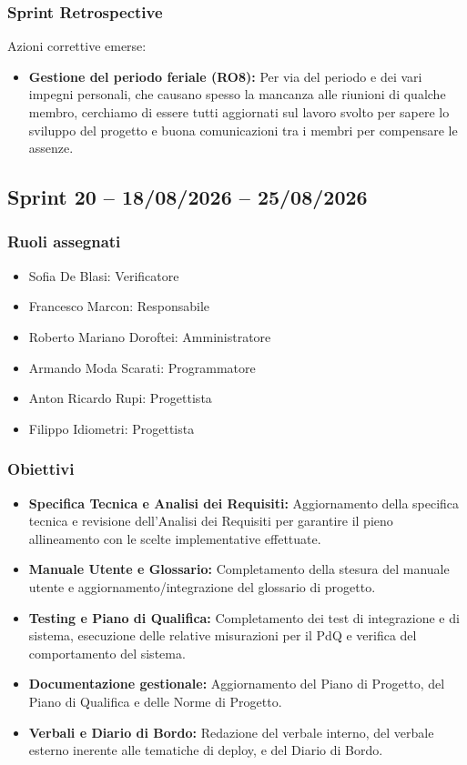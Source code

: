 \subsubsection{Sprint Retrospective}
Azioni correttive emerse:
\begin{itemize}
    \item \textbf{Gestione del periodo feriale (RO8):} Per via del periodo e dei vari impegni personali, che causano spesso la mancanza alle riunioni di qualche membro, cerchiamo di essere tutti aggiornati sul lavoro svolto per sapere lo sviluppo del progetto e buona comunicazioni tra i membri per compensare le assenze.
\end{itemize}

\subsection{Sprint 20 -- 18/08/2026 -- 25/08/2026}
\label{sec:sprint20}

\subsubsection{Ruoli assegnati}
\begin{itemize}
    \item Sofia De Blasi: Verificatore
    \item Francesco Marcon: Responsabile
    \item Roberto Mariano Doroftei: Amministratore
    \item Armando Moda Scarati: Programmatore
    \item Anton Ricardo Rupi: Progettista
    \item Filippo Idiometri: Progettista
\end{itemize}

\subsubsection{Obiettivi}
\begin{itemize}
    \item \textbf{Specifica Tecnica e Analisi dei Requisiti:} Aggiornamento della specifica tecnica e revisione dell'Analisi dei Requisiti per garantire il pieno allineamento con le scelte implementative effettuate.
    \item \textbf{Manuale Utente e Glossario:} Completamento della stesura del manuale utente e aggiornamento/integrazione del glossario di progetto.
    \item \textbf{Testing e Piano di Qualifica:} Completamento dei test di integrazione e di sistema, esecuzione delle relative misurazioni per il PdQ e verifica del comportamento del sistema.
    \item \textbf{Documentazione gestionale:} Aggiornamento del Piano di Progetto, del Piano di Qualifica e delle Norme di Progetto.
    \item \textbf{Verbali e Diario di Bordo:} Redazione del verbale interno, del verbale esterno inerente alle tematiche di deploy, e del Diario di Bordo.
\end{itemize}


